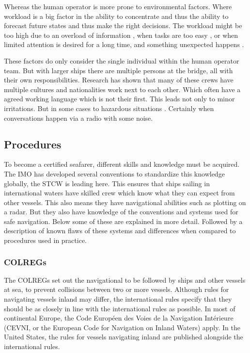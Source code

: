 Whereas the human operator is more prone to environmental factors. Where workload is a big factor in the ability to concentrate and thus the ability to forecast future states and thus make the right decisions. The workload might be too high due to an overload of information \cite{Speier1999}, when tasks are too easy \cite{Washburn2001}, or when limited attention is desired for a long time, and something unexpected happens \cite{McMorris2018}.

These factors do only consider the single individual within the human operator team. But with larger ships there are multiple persons at the bridge, all with their own responsibilities. Research has shown that many of these crews have multiple cultures and nationalities work next to each other. Which often have a agreed working language which is not their first. This leads not only to minor irritations. But in some cases to hazardous situations \cite{Hetherington2006}. Certainly when conversations happen via a radio with some noise. 

\subsection{Procedures}
\label{apps:procedures}
To become a certified seafarer, different skills and knowledge must be acquired. The \ac{IMO} has developed several conventions to standardize this knowledge globally, the \ac{STCW} is leading here. This ensures that ships sailing in international waters have skilled crew which know what they can expect from other vessels. This also means they have navigational abilities such as plotting on a radar. But they also have knowledge of the conventions and systems used for safe navigation. Below some of these are explained in more detail. Followed by a description of known flaws of these systems and differences when compared to procedures used in practice.

\subsubsection{\acf{COLREGs}}
The \ac{COLREGs} set out the navigational to be followed by ships and other vessels at sea, to prevent collisions between two or more vessels. Although rules for navigating vessels inland may differ, the international rules specify that they should be as closely in line with the international rules as possible. In most of continental Europe, the Code Européen des Voies de la Navigation Intérieure (CEVNI, or the European Code for Navigation on Inland Waters) apply. In the United States, the rules for vessels navigating inland are published alongside the international rules.

